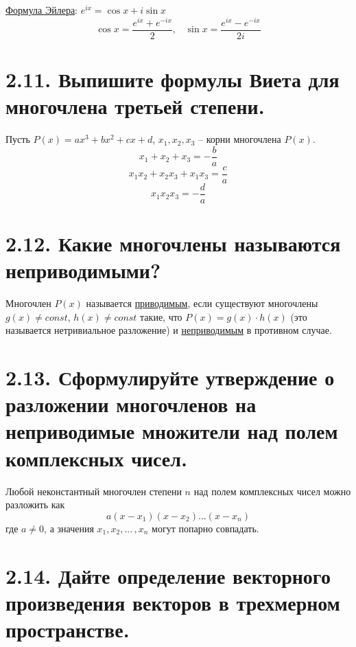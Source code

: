\documentclass{article}
\begin{document}
\underline{Формула Эйлера}:
$ e^{ix} = \cos{x} + i\sin{x} $
$$ \cos{x} = \frac{e^{ix} + e^{-ix}}{2}, \;\;\; \sin{x} = \frac{e^{ix} - e^{-ix}}{2i} $$

\section*{\LARGE 2.11. Выпишите формулы Виета для многочлена третьей степени.  }

Пусть $P(x) = ax^3 + bx^2 + cx + d$, $x_1, x_2, x_3$ -- корни многочлена $P(x)$.
$$ x_1 + x_2 + x_3 = -\frac{b}{a} $$
$$ x_1x_2 + x_2x_3 + x_1x_3 = \frac{c}{a} $$
$$ x_1x_2x_3 = -\frac{d}{a} $$

\section*{\LARGE 2.12. Какие многочлены называются неприводимыми? }

Многочлен $P(x)$ называется \underline{приводимым}, если существуют многочлены 
\newline $g(x) \ne const$, $h(x) \ne const$ такие, что $P(x) = g(x) \cdot h(x)$ (это называется нетривиальное разложение) и \underline{неприводимым} в противном случае.

\section*{\LARGE 2.13. Сформулируйте утверждение о разложении многочленов на неприводимые множители над полем комплексных чисел.  }

Любой неконстантный многочлен степени $n$ над полем комплексных чисел можно разложить как 
$$ a(x - x_1)(x - x_2)...(x - x_n) $$
где $a \ne 0$, а значения $x_1, x_2, ...\,, x_n$ могут попарно совпадать.

\section*{\LARGE 2.14. Дайте определение векторного произведения векторов в трехмерном пространстве. }
\end{document}
